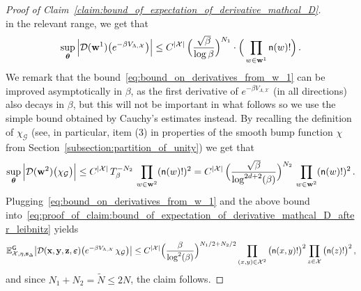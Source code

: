 \documentclass[11pt]{article}
\theoremstyle{definition}
\theoremstyle{remark}
\numberwithin{theorem}{section}
\def\eps{{\varepsilon}}
\def\La{{\Lambda}}
\newcommand{\bE}{\mathbb E}
\begin{document}
\begin{proof}[Proof of Claim~\ref{claim:bound_of_expectation_of_derivative_mathcal_D}]
\[        \]
        in the relevant range, we get that 
        \begin{equation} \label{eq:bound_on_derivatives_from_w_1}
            \sup_{\boldsymbol{\theta}} \Big|\mathcal{D} (\mathbf{w}^1) \big(e^{-\beta V_{\La,\mathcal{X}}} \big) \Big| \le C^{|\mathcal{X}|} \,  \Big(\frac{\sqrt{\beta}}{\log \beta} \Big)^{N_1} \cdot \Big( \prod_{w\in \mathbf{w}^1} {\sf n}(w)! \Big) \, . 
        \end{equation}
        We remark that the bound~\eqref{eq:bound_on_derivatives_from_w_1} can be improved asymptotically in $\beta$, as the first derivative of $e^{-\beta V_{\La,\mathcal{X}}}$ (in all directions) also decays in $\beta$, but this will not be important in what follows so we use the simple bound obtained by Cauchy's estimates instead. By recalling the definition of $\chi_\mathcal{G}$ (see, in particular, item (3) in properties of the smooth bump function $\chi$ from Section~\ref{subsection:partition_of_unity}) we get that  
        \[
        \sup_{\boldsymbol{\theta}} \Big|\mathcal{D} (\mathbf{w}^2) \big(\chi_{\mathcal{G}} \big) \Big| \le C^{|\mathcal{X}|} \,  T_\beta^{-N_2} \, \prod_{w\in \mathbf{w}^2} ({\sf n}(w)!)^2 =  C^{|\mathcal{X}|} \,  \Big(\frac{\sqrt{\beta}}{\log^{2d+2}(\beta)}\Big)^{N_2} \, \prod_{w\in \mathbf{w}^2} ({\sf n}(w)!)^2  \, . 
        \]
        Plugging~\eqref{eq:bound_on_derivatives_from_w_1} and the above bound into~\eqref{eq:proof_of_claim:bound_of_expectation_of_derivative_mathcal_D_after_leibnitz} yields 
        \[
        \bE_{\mathcal{X},\eta,\mathbf{s}_{\Delta}}^{\sf G} \big|\mathcal{D}(\mathbf{x},\mathbf{y},\mathbf{z}, \boldsymbol{\eps} ) \big(e^{-\beta V_{\La,\mathcal{X}}} \, \chi_{\mathcal{G}} \big)\big| \le C^{|\mathcal{X}|} \Big(\frac{\beta}{\log^2(\beta)}\Big)^{N_1/2 + N_2/2} \prod_{(x,y)\in \mathcal{X}^2} \big({\sf n}(x,y)!\big)^2 \prod_{z\in \mathcal{X}} \big( {\sf n}(z)!\big)^2 \, ,
        \]
        and since $N_1 + N_2 = \widetilde N \le 2N$, the claim follows. 
    \end{proof}
    
\end{document}
